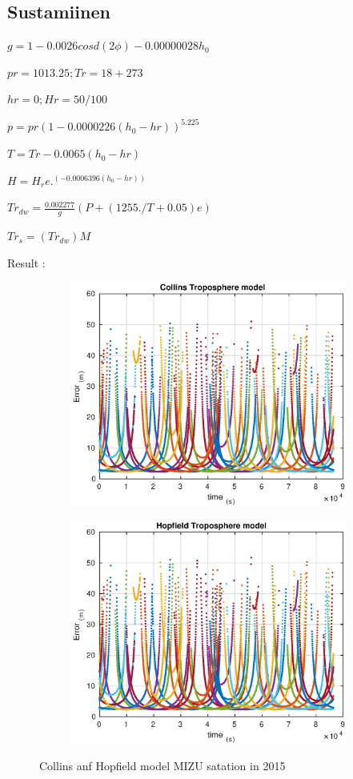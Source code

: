 \documentclass[12pt]{article}
\begin{document}
\subsection{Sustamiinen}
\centerline{$g = 1 - 0.0026 cosd(2\phi)-0.00000028 h_0$}
\centerline{$ pr = 1013.25;
 Tr = 18+273$}
\centerline{$ hr = 0;
 Hr = 50/100$}
\centerline{$ p = pr(1-0.0000226(h_0-hr))^5.225$}
\centerline{$ T = Tr - 0.0065(h_0-hr)$}
\centerline{$ H = H_r e.^(-0.0006396 (h_0-hr))$}
\centerline{$Tr_{dw} = \frac{0.002277}{g}(P+(1255./T+0.05)e)$}
\centerline{$Tr_s = (Tr_{dw})M$}

Result : 

\begin{figure}[H]
  \begin{subfigure}[b]{0.5 \textwidth}
    \includegraphics[width=\textwidth]{img/col}
  \end{subfigure}
  \hfill
  \begin{subfigure}[b]{0.5\textwidth}
    \includegraphics[width=\textwidth]{img/hop}
  \end{subfigure}
  \caption{Collins anf Hopfield model MIZU satation in 2015}
\end{figure}
\end{document}
